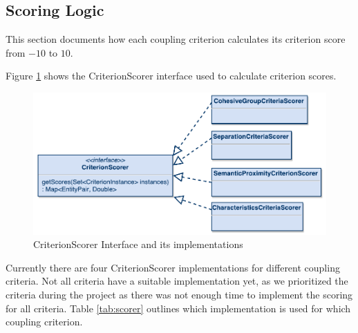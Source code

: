 \subsection{Scoring Logic}

This section documents how each coupling criterion calculates its criterion score from $-10$ to $10$. 

Figure \ref{fig:scorer} shows the CriterionScorer interface used to calculate criterion scores. 

\begin{figure}[H]
	\begin{center}
		\includegraphics[scale=0.7]{diagrams/scorer.pdf}
		\caption{CriterionScorer Interface and its implementations}
		\label{fig:scorer}
	\end{center}
\end{figure}


Currently there are four CriterionScorer implementations for different coupling criteria. Not all criteria have a suitable implementation yet, as we prioritized the criteria during the project as there was not enough time to implement the scoring for all criteria. Table \ref{tab:scorer} outlines which implementation is used for which coupling criterion.


